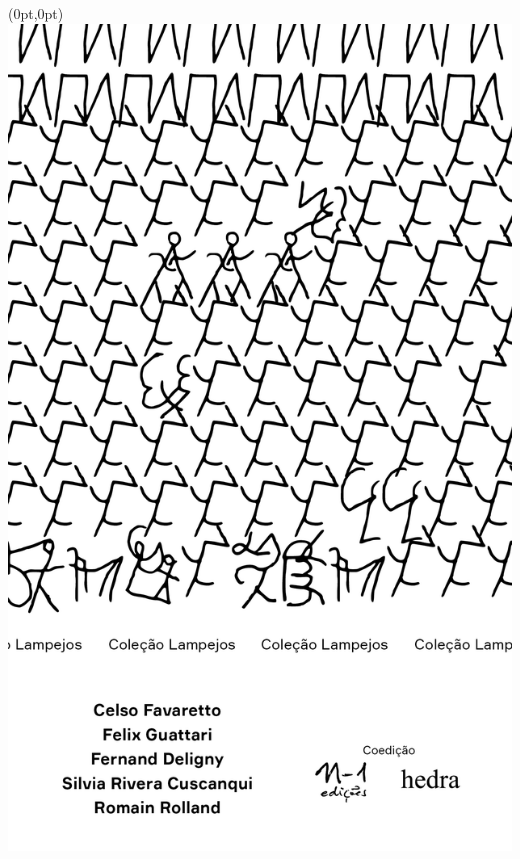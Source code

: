 \pagestyle{n-1}
\label{n-1}

\begin{textblock*}{5.625in}(0pt,0pt)%
\vspace*{-3.2cm}
\hspace*{-1.95cm}\includegraphics*[width=160mm]{./imgs/N-1.png}
\end{textblock*}

\pagebreak %

